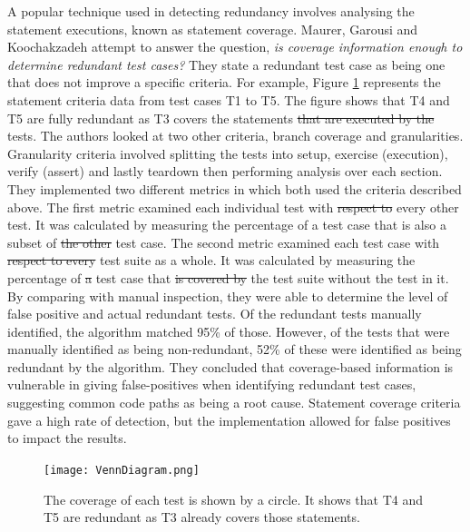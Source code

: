 \documentclass[11pt
              , a4paper
              , twoside
              , openright
              ]{report}
\providecommand{\DIFadd}[1]{{\protect\color{blue}\uwave{#1}}} %
\providecommand{\DIFdel}[1]{{\protect\color{red}\sout{#1}}}                      %
\providecommand{\DIFaddbegin}{} %
\providecommand{\DIFaddend}{} %
\providecommand{\DIFdelbegin}{} %
\providecommand{\DIFdelend}{} %
\begin{document}
A popular technique used in detecting redundancy involves analysing the statement executions, known as statement coverage. Maurer, Garousi and Koochakzadeh \cite{koochakzadeh2009test} attempt to answer the question, \textit{is coverage information enough to determine redundant test cases?} They state a redundant test case as being one that does not improve a specific criteria. For example, Figure \ref{fig:venndiagram} represents the statement criteria data from test cases T1 to T5. The figure shows that T4 and T5 are fully redundant as T3 covers the statements \DIFdelbegin \DIFdel{that are executed by the }\DIFdelend \DIFaddbegin \DIFadd{executed by these }\DIFaddend tests. The authors looked at two other criteria, branch coverage and granularities. Granularity criteria involved splitting the tests into setup, exercise (execution), verify (assert) and lastly teardown then performing analysis over each section. They implemented two different metrics in which both used the criteria described above. The first metric examined each individual test with \DIFdelbegin \DIFdel{respect to }\DIFdelend every other test. It was calculated by measuring the percentage of a test case that is also a subset of \DIFdelbegin \DIFdel{the other }\DIFdelend \DIFaddbegin \DIFadd{another }\DIFaddend test case. The second metric examined each test case with \DIFdelbegin \DIFdel{respect to every }\DIFdelend \DIFaddbegin \DIFadd{the }\DIFaddend test suite as a whole. It was calculated by measuring the percentage of \DIFdelbegin \DIFdel{a }\DIFdelend \DIFaddbegin \DIFadd{the }\DIFaddend test case that \DIFdelbegin \DIFdel{is covered by }\DIFdelend the test suite \DIFaddbegin \DIFadd{covered }\DIFaddend without the test in it. By comparing with manual inspection, they were able to determine the level of false positive and actual redundant tests. Of the redundant tests manually identified, the algorithm matched 95\% of those. However, of the tests that were manually identified as being non-redundant, 52\% of these were identified as being redundant by the algorithm. They concluded that coverage-based information is vulnerable in giving false-positives when identifying redundant test cases, suggesting common code paths as being a root cause. Statement coverage criteria gave a high rate of detection, but the implementation allowed for false positives to impact the results. 

\begin{figure}[h]
\begin{center}
\texttt{[image: VennDiagram.png]}
\end{center}
\caption{The coverage of each test is shown by a circle. It shows that T4 and T5 are redundant as T3 already covers those statements.}
\label{fig:venndiagram}
\end{figure}
\end{document}
